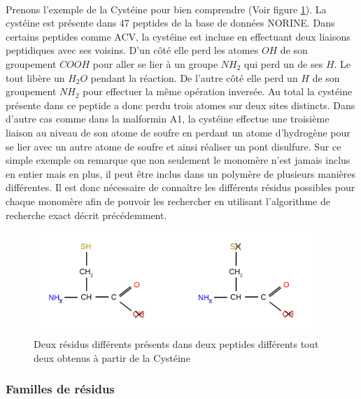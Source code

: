 \documentclass[12pt,french,twoside]{report}
\begin{document}
\paragraph{}Prenons l'exemple de la Cystéine pour bien comprendre (Voir figure \ref{cys_ex}).
La cystéine est présente dans 47 peptides de la base de données
NORINE. Dans certains peptides comme ACV, la cystéine est incluse en effectuant deux liaisons peptidiques avec ses voisins. D'un
côté elle perd les atomes $OH$ de son groupement $COOH$ pour aller se lier à un groupe $NH_2$ qui perd un de ses $H$. Le tout
libère un $H_2O$ pendant la réaction. De l'autre côté elle perd un $H$ de son groupement $NH_2$ pour effectuer la même opération
inversée. Au total la cystéine présente dans ce peptide a donc perdu trois atomes sur deux sites distincts. Dans d'autre cas
comme dans la malformin A1, la cystéine effectue une troisième liaison au niveau de son atome de soufre en perdant un atome 
d'hydrogène pour se lier avec un autre atome de soufre et ainsi réaliser un pont disulfure. Sur ce simple exemple on remarque que
non seulement le monomère n'est jamais inclus en entier mais en plus, il peut être inclus dans un polymère de plusieurs manières
différentes. Il est donc nécessaire de connaître les différents résidus possibles pour chaque monomère afin de pouvoir les
rechercher en utilisant l'algorithme de recherche exact décrit précédemment.

\begin{figure}[!ht]
  \begin{center}
    \includegraphics[width=400px]{Figures/s2m/residues/cys_exemple.png}
    \caption{\label{cys_ex}Deux résidus différents présents dans deux peptides différents tout deux obtenus à partir de la Cystéine}
  \end{center}
\end{figure}


\subsubsection{Familles de résidus}
\end{document}
